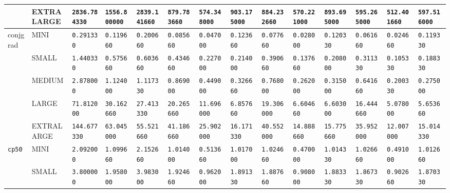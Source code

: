\begin{tabular}{l | l | l | l | l | l | l | l | l | l | l | l | l | l}
             & EXTRALARGE & \verb|2836.784330  | & \verb|1556.800000 | & \verb|2839.141660 | & \verb|879.783660  | & \verb|574.348000  | & \verb|903.175000  | & \verb|884.232660  | & \verb|570.221000  | & \verb|893.695000  | & \verb|595.265000  | & \verb|512.401660  | & \verb|597.516000  | \\ \hline
    conjgrad & MINI       & \verb|0.291330     | & \verb|0.119660    | & \verb|0.200660    | & \verb|0.085660    | & \verb|0.047000    | & \verb|0.123660    | & \verb|0.077660    | & \verb|0.028000    | & \verb|0.120330    | & \verb|0.061660    | & \verb|0.024660    | & \verb|0.119330    | \\ \hline
             & SMALL      & \verb|1.440330     | & \verb|0.575660    | & \verb|0.603660    | & \verb|0.434660    | & \verb|0.227000    | & \verb|0.214000    | & \verb|0.390660    | & \verb|0.137660    | & \verb|0.208000    | & \verb|0.311330    | & \verb|0.105330    | & \verb|0.188330    | \\ \hline
             & MEDIUM     & \verb|2.878000     | & \verb|1.124000    | & \verb|1.117330    | & \verb|0.869000    | & \verb|0.449000    | & \verb|0.326660    | & \verb|0.768000    | & \verb|0.262000    | & \verb|0.315000    | & \verb|0.641660    | & \verb|0.200330    | & \verb|0.275000    | \\ \hline
             & LARGE      & \verb|71.812000    | & \verb|30.162660   | & \verb|27.413330   | & \verb|20.265660   | & \verb|11.696000   | & \verb|6.857660    | & \verb|19.306000   | & \verb|6.604660    | & \verb|6.603000    | & \verb|16.444660   | & \verb|5.078000    | & \verb|5.653660    | \\ \hline
             & EXTRALARGE & \verb|144.677330   | & \verb|63.045000   | & \verb|55.521660   | & \verb|41.186660   | & \verb|25.902000   | & \verb|16.171330   | & \verb|40.552000   | & \verb|14.888660   | & \verb|15.775660   | & \verb|35.952000   | & \verb|12.007000   | & \verb|15.014330   | \\ \hline
    \verb|cp50    | & MINI       & \verb|2.092000     | & \verb|1.099660    | & \verb|2.152660    | & \verb|1.014000    | & \verb|0.513660    | & \verb|1.017000    | & \verb|1.024660    | & \verb|0.470000    | & \verb|1.014330    | & \verb|1.026660    | & \verb|0.491000    | & \verb|1.012660    | \\ \hline
             & SMALL      & \verb|3.800000     | & \verb|1.958000    | & \verb|3.983000    | & \verb|1.924660    | & \verb|0.962000    | & \verb|1.891330    | & \verb|1.887660    | & \verb|0.908000    | & \verb|1.883330    | & \verb|1.867330    | & \verb|0.902660    | & \verb|1.870330    | \\ \hline

\end{tabular}
